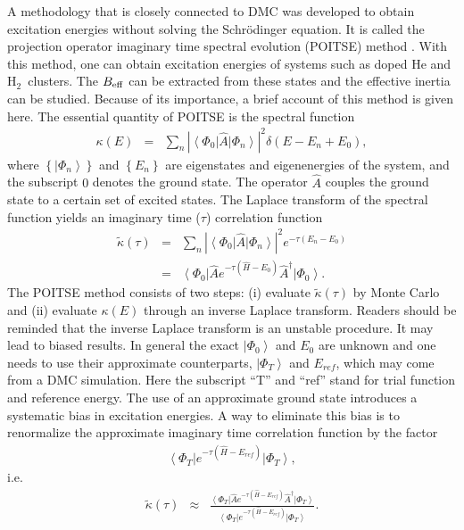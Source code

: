 \documentclass[12pt]{iopart}
\newcommand{\hydrogen}{H$_2$}
\begin{document}
A methodology that is closely connected to DMC was developed to obtain excitation energies without solving the Schr\"odinger equation. It is called the projection operator imaginary time spectral evolution (POITSE) method \cite{poitse1}. With this method, one can obtain excitation energies of systems such as doped He and \hydrogen~clusters. The $B_{\rm eff}$ can be extracted from these states and the effective inertia can be studied. Because of its importance, a brief account of this method is given here.
The essential quantity of POITSE is the spectral function
\begin{eqnarray}
\kappa\left(E\right)&=&\sum_n \left| \left< \Phi_0 \right|\hat{A}\left| \Phi_n \right> \right|^2 \delta\left( E-E_n+E_0 \right),
\end{eqnarray} 
where $\left\{ \left| \Phi_n \right> \right\}$ and $\left\{ E_n \right\}$ are eigenstates and eigenenergies of the system, and the subscript $0$ denotes the ground state. The operator $\hat{A}$ couples the ground state to a certain set of excited states. The Laplace transform of the spectral function 
yields an imaginary time ($\tau$) correlation function  
\begin{eqnarray}
\tilde{\kappa}\left( \tau \right)&=&\sum_n \left| \left< \Phi_0 \right|\hat{A}\left| \Phi_n \right> \right|^2 e^{ -\tau\left(E_n - E_0\right) } \nonumber\\
&=&\left< \Phi_0\right| \hat{A} e^{-\tau\left( \hat{H}-E_0 \right) } \hat{A}^\dagger \left| \Phi_0 \right>.
\end{eqnarray}
The POITSE method consists of two steps: (i) evaluate $\tilde{\kappa}\left( \tau \right)$ by Monte Carlo  and (ii) evaluate $\kappa\left(E\right)$ through an inverse Laplace transform. 
Readers should be reminded that the inverse Laplace transform is an unstable procedure. It may lead to biased results.
In general the exact $\left| \Phi_0 \right>$ and $E_0$ are unknown and one needs to use their approximate counterparts, $\left| \Phi_T \right>$ and $E_{ref}$, which may come from a DMC simulation. 
Here the subscript ``T'' and ``ref'' stand for trial function and reference energy. 
The use of an approximate ground state introduces a systematic bias in excitation energies. A way to eliminate this bias is to renormalize the approximate imaginary time correlation function by the factor~\cite{poitse1}
\begin{eqnarray}
\left< \Phi_T\right| e^{ -\tau\left( \hat{H}-E_{ref} \right)  } \left| \Phi_T \right>,
\end{eqnarray}
i.e.
\begin{eqnarray}
\tilde{\kappa}\left( \tau \right)&\approx&\frac{\left< \Phi_T\right| \hat{A} e^{ -\tau\left( \hat{H}-E_{ref} \right) }\hat{A}^\dagger \left| \Phi_T \right>}{\left< \Phi_T\right| e^{ -\tau\left( \hat{H}-E_{ref} \right) } \left| \Phi_T \right>}.
\end{eqnarray}
\end{document}
